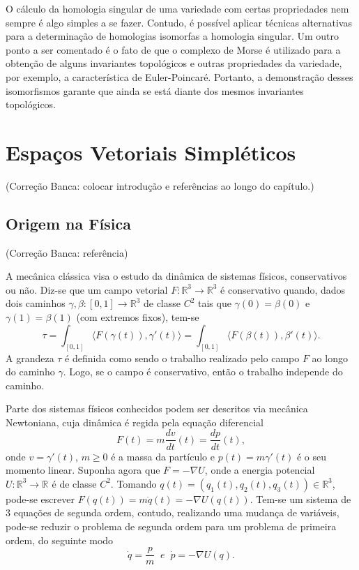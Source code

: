 \documentclass[12pt]{book}
\newcommand{\derivada}[2]{\frac{d #1}{d #2}}
\newcommand{\intervalo}{[0,1]}
\newcommand{\produtointerno}[2]{\langle #1, #2 \rangle}
\newcommand{\real}[1]{\mathbb{R}^{#1}}
\newcommand{\reta}{\real{}}
\newcommand{\alerta}[1]{{\color{red}#1}}
\newcommand{\correcaobanca}[1]{\alerta{(Correção Banca: #1)}}
\begin{document}
	O cálculo da homologia singular de uma variedade com certas propriedades nem sempre é algo simples a se fazer. Contudo, é possível aplicar técnicas alternativas para a determinação de homologias isomorfas a homologia singular. Um outro ponto a ser comentado é o fato de que o complexo de Morse é utilizado para a obtenção de alguns invariantes topológicos e outras propriedades  da variedade, por exemplo, a característica de Euler-Poincaré. Portanto, a demonstração desses isomorfismos garante que ainda se está diante dos mesmos invariantes topológicos.
	
	
	\chapter{Espaços Vetoriais Simpléticos}\label{capitulo_espacos_vetoriais_simpleticos}
	\correcaobanca{colocar introdução e referências ao longo do capítulo.}
	\section{Origem na Física}
	\correcaobanca{referência}
	
	A mecânica clássica visa o estudo da dinâmica de sistemas físicos, conservativos ou não. Diz-se que um campo vetorial $F:\real{3} \to \real{3}$ é conservativo quando, dados dois caminhos $\gamma,\beta:[0,1] \to \real{3}$ de classe $C^{2}$ tais que $\gamma(0)=\beta(0)$ e $\gamma(1)=\beta(1)$ (com extremos fixos), tem-se
	$$
	\tau=\int_{\intervalo} \produtointerno{F(\gamma(t))}{\gamma'(t)}=
	\int_{\intervalo} \produtointerno{F(\beta(t))}{\beta'(t)}.
	$$
	A grandeza $\tau$ é definida como sendo o trabalho realizado pelo campo $F$ ao longo do caminho $\gamma$. Logo, se o campo é conservativo, então o trabalho independe do caminho.
	
	Parte dos sistemas físicos conhecidos podem ser descritos via mecânica Newtoniana, cuja dinâmica é regida pela equação diferencial 
	$$
	F(t) = m\derivada{v}{t}(t) = \derivada{p}{t}(t),
	$$
	onde $v = \gamma'(t)$, $m\geq0$ é a massa da partículo e $p(t) = m\gamma'(t)$ é o seu momento linear. Suponha agora que $F = -\nabla U$, onde a energia potencial $U:\real{3}\to \reta$ é de classe $C^{2}$. Tomando $q(t)=(q_{1}(t),q_{2}(t), q_{3}(t))\in \real{3}$, pode-se escrever $F(q(t)) =m \ddot{q}(t)= -\nabla U(q(t))$. Tem-se um sistema de 3 equações de segunda ordem, contudo, realizando uma mudança de variáveis, pode-se reduzir o problema de segunda ordem para um problema de primeira ordem, do seguinte modo
	$$
	\dot{q} = \frac{p}{m} \;\; e \;\;\dot{p} = -\nabla U(q).
	$$
	
\end{document}
